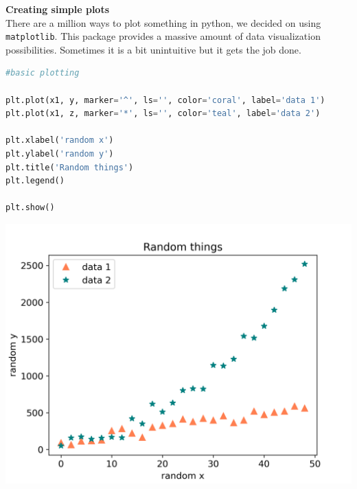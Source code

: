 \documentclass{article}
\begin{document}
\vspace{5pt}
\noindent
\begin{minipage}{.5\textwidth}

\textbf{\large Creating simple plots}\\
There are a million ways to plot something in python, we decided on using \lstinline{matplotlib}. This package provides a massive amount of data visualization possibilities. Sometimes it is a bit unintuitive but it gets the job done. 

\begin{lstlisting}[language=python, numbers=none]   
#basic plotting

plt.plot(x1, y, marker='^', ls='', color='coral', label='data 1') 
plt.plot(x1, z, marker='*', ls='', color='teal', label='data 2') 

plt.xlabel('random x')
plt.ylabel('random y')
plt.title('Random things')
plt.legend()

plt.show()    
\end{lstlisting}

\end{minipage}%
\hspace{.05\textwidth}\begin{minipage}{.5\textwidth}
  \centering
  \includegraphics[width=.9\linewidth]{figures/simple-plot.png}\\

\end{minipage}
\end{document}
